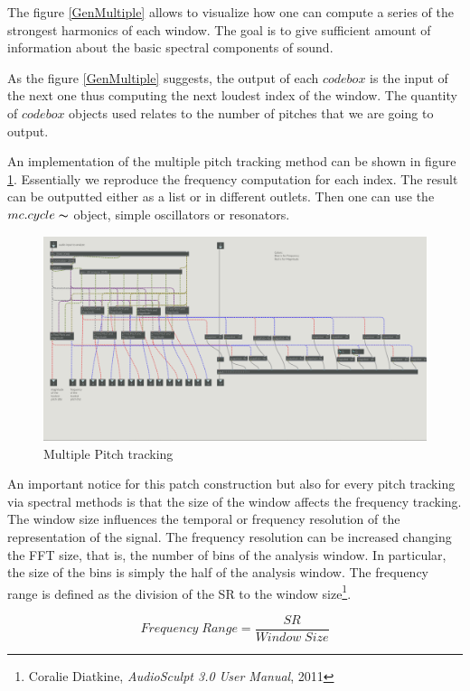 The figure \ref{GenMultiple} allows to visualize how one can compute a series of the strongest harmonics of each window. The goal is to give sufficient amount of information about the basic spectral components of sound.

As the figure \ref{GenMultiple} suggests, the output of each $codebox$ is the input of the next one thus computing the next loudest index of the window. The quantity of $codebox$ objects used relates to the number of pitches that we are going to output.

An implementation of the multiple pitch tracking method can be shown in figure \ref{Analysis}. Essentially we reproduce the frequency computation for each index. The result can be outputted either as a list or in different outlets. Then one can use the $mc.cycle\thicksim$ object, simple oscillators or resonators.

    \begin{figure}
        \centering
        \includegraphics[width = \textwidth]{Graphs/MultipleTrack.png}
        \caption{Multiple Pitch tracking}
        \label{Analysis}
    \end{figure}

An important notice for this patch construction but also for every pitch tracking via spectral methods is that the size of the window affects the frequency tracking. The window size influences the temporal or frequency resolution of the representation of the signal. The frequency resolution can be increased changing the FFT size, that is, the number of bins of the analysis window. In particular, the size of the bins is simply the half of the analysis window. The frequency range is defined as the division of the SR to the window size\footnote{Coralie Diatkine, \textit{AudioSculpt 3.0 User Manual}, 2011 \nocite{Audiosculpt}}.

    \begin{equation*}
        Frequency \; Range = \frac{SR}{Window \; Size}
    \end{equation*}

